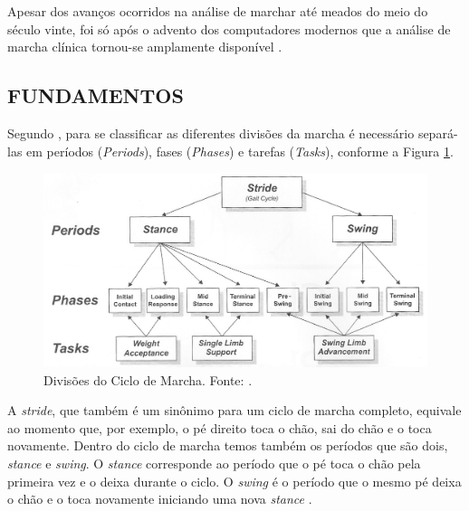 Apesar dos avanços ocorridos na análise de marchar até meados do meio do século vinte, foi só após o advento dos computadores modernos que a análise de marcha clínica tornou-se amplamente disponível \cite{Baker2007}.



\subsection{FUNDAMENTOS}
Segundo , para se classificar as diferentes divisões da marcha é necessário separá-las em períodos (\emph{Periods}), fases (\emph{Phases}) e tarefas (\emph{Tasks}), conforme a Figura \ref{fases_marcha}.

\begin{figure}[ht]
	\centering
	\includegraphics[width=15cm]{figuras/fases_marcha.eps}
	\caption{Divisões do Ciclo de Marcha. Fonte: .}
	\label{fases_marcha}
\end{figure}

A \emph{stride}, que também é um sinônimo para um ciclo de marcha completo, equivale ao momento que, por exemplo, o pé direito toca o chão, sai do chão e o toca novamente. Dentro do ciclo de marcha temos também os períodos que são dois, \emph{stance} e \emph{swing}. 
O \emph{stance} corresponde ao período que o pé toca o chão pela primeira vez e o deixa durante o ciclo. 
O \emph{swing} é o período que o mesmo pé deixa o chão e o toca novamente iniciando uma nova \emph{stance} \cite{Perry2010}. 

